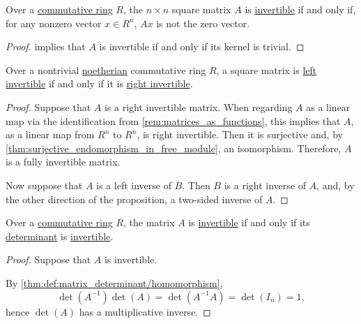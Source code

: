 \begin{proposition}\label{thm:matrix_invertibility_via_kernel}
  Over a \hyperref[def:ring/commutative]{commutative ring} \( R \), the \( n \times n \) square matrix \( A \) is \hyperref[def:inverse_matrix]{invertible} if and only if, for any nonzero vector \( x \in R^n \), \( Ax \) is not the zero vector.
\end{proposition}
\begin{proof}
   implies that \( A \) is invertible if and only if its kernel is trivial.
\end{proof}

\begin{proposition}\label{thm:square_matrix_left_invertible_iff_right_invertible}
  Over a nontrivial \hyperref[def:noetherian_semiring]{noetherian} commutative ring \( R \), a square matrix is \hyperref[def:inverse_matrix]{left invertible} if and only if it is \hyperref[def:inverse_matrix]{right invertible}.
\end{proposition}
\begin{proof}
  \NecessitySubProof Suppose that \( A \) is a right invertible matrix. When regarding \( A \) as a linear map via the identification from \cref{rem:matrices_as_functions}, this implies that \( A \), as a linear map from \( R^n \) to \( R^n \), is right invertible. Then it is surjective and, by \cref{thm:surjective_endomorphism_in_free_module}, an isomorphism. Therefore, \( A \) is a fully invertible matrix.

  \SufficiencySubProof Now suppose that \( A \) is a left inverse of \( B \). Then \( B \) is a right inverse of \( A \), and, by the other direction of the proposition, a two-sided inverse of \( A \).
\end{proof}

\begin{proposition}\label{thm:matrix_invertibility_via_determinants}
  Over a \hyperref[def:ring/commutative]{commutative ring} \( R \), the matrix \( A \) is \hyperref[def:inverse_matrix]{invertible} if and only if its \hyperref[def:matrix_determinant]{determinant} is \hyperref[def:semiring_divisibility/invertible]{invertible}.
\end{proposition}
\begin{proof}
  \SufficiencySubProof Suppose that \( A \) is invertible.

  By \cref{thm:def:matrix_determinant/homomorphism},
  \begin{equation*}
    \det(A^{-1}) \det(A) = \det(A^{-1} A) = \det(I_n) = 1,
  \end{equation*}
  hence \( \det(A) \) has a multiplicative inverse.

  \NecessitySubProof {}
\end{proof}

